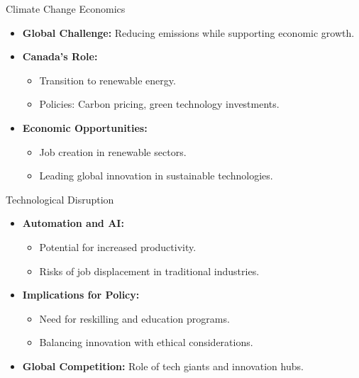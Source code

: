 \documentclass{beamer}
\begin{document}
\begin{frame}{Climate Change Economics}
  \begin{itemize}
    \item \textbf{Global Challenge:} Reducing emissions while supporting economic growth.
    \item \textbf{Canada’s Role:}
      \begin{itemize}
        \item Transition to renewable energy.
        \item Policies: Carbon pricing, green technology investments.
      \end{itemize}
    \item \textbf{Economic Opportunities:}
      \begin{itemize}
        \item Job creation in renewable sectors.
        \item Leading global innovation in sustainable technologies.
      \end{itemize}
  \end{itemize}
\end{frame}

\begin{frame}{Technological Disruption}
  \begin{itemize}
    \item \textbf{Automation and AI:}
      \begin{itemize}
        \item Potential for increased productivity.
        \item Risks of job displacement in traditional industries.
      \end{itemize}
    \item \textbf{Implications for Policy:}
      \begin{itemize}
        \item Need for reskilling and education programs.
        \item Balancing innovation with ethical considerations.
      \end{itemize}
    \item \textbf{Global Competition:} Role of tech giants and innovation hubs.
  \end{itemize}
\end{frame}
\end{document}
